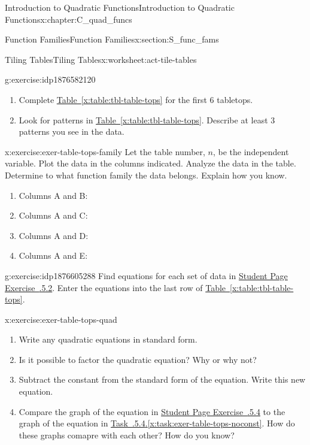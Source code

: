 \documentclass[oneside,10pt,]{book}
\newcommand{\xreffont}{\relax}
\numberwithin{equation}{chapter}
\begin{document}
\begin{chapterptx}{Introduction to Quadratic Functions}{}{Introduction to Quadratic Functions}{}{}{x:chapter:C_quad_funcs}
\begin{sectionptx}{Function Families}{}{Function Families}{}{}{x:section:S_func_fams}
\begin{worksheet-subsection}{Tiling Tables}{}{Tiling Tables}{}{}{x:worksheet:act-tile-tables}
\begin{divisionexercise}{1}{}{}{g:exercise:idp1876582120}
\begin{enumerate}[font=\bfseries,label=(\alph*),ref=\alph*]
\item{}Complete \hyperref[x:table:tbl-table-tops]{Table~{\xreffont\ref{x:table:tbl-table-tops}}} for the first 6 tabletops.%
\item{}Look for patterns in \hyperref[x:table:tbl-table-tops]{Table~{\xreffont\ref{x:table:tbl-table-tops}}}. Describe at least 3 patterns you see in the data.%
\end{enumerate}
\end{divisionexercise}%
\begin{divisionexercise}{2}{}{}{x:exercise:exer-table-tops-family}%
Let the table number, \(n\), be the independent variable. Plot the data in the columns indicated. Analyze the data in the table. Determine to what function family the data belongs. Explain how you know.%
\begin{enumerate}[font=\bfseries,label=(\alph*),ref=\alph*]
\item{}Columns A and B:%
\item{}Columns A and C:%
\item{}Columns A and D:%
\item{}Columns A and E:%
\end{enumerate}
\end{divisionexercise}%
\begin{divisionexercise}{3}{}{}{g:exercise:idp1876605288}%
Find equations for each set of data in \hyperlink{x:exercise:exer-table-tops-family}{Student Page Exercise~{\xreffont 4.5.5.2}}. Enter the equations into the last row of \hyperref[x:table:tbl-table-tops]{Table~{\xreffont\ref{x:table:tbl-table-tops}}}.%
\end{divisionexercise}%
\begin{divisionexercise}{4}{}{}{x:exercise:exer-table-tops-quad}%
\begin{enumerate}[font=\bfseries,label=(\alph*),ref=\alph*]
\item{}Write any quadratic equations in standard form.%
\item{}Is it possible to factor the quadratic equation? Why or why not?%
\item\label{x:task:exer-table-tops-noconst}Subtract the constant from the standard form of the equation. Write this new equation.%
\item{}Compare the graph of the equation in \hyperlink{x:exercise:exer-table-tops-quad}{Student Page Exercise~{\xreffont 4.5.5.4}} to the graph of the equation in \hyperref[x:task:exer-table-tops-noconst]{Task~{\xreffont 4.5.5.4}.{\xreffont\ref{x:task:exer-table-tops-noconst}}}. How do these graphs comapre with each other? How do you know?%

\end{enumerate}
\end{divisionexercise}
\end{worksheet-subsection}
\end{sectionptx}
\end{chapterptx}
\end{document}
